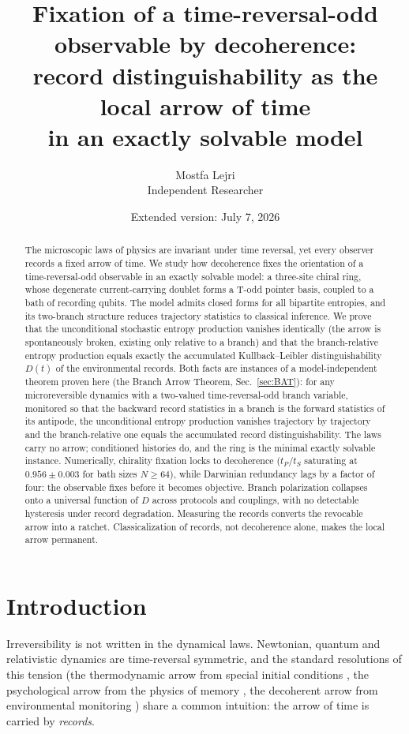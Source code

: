 \documentclass[11pt]{article}
\title{\bfseries Fixation of a time-reversal-odd observable by decoherence:\\
record distinguishability as the local arrow of time\\
in an exactly solvable model}
\author{Mostfa Lejri\\[2pt]
\small Independent Researcher}
\date{\small Extended version: July 7, 2026}
\begin{document}
\maketitle

\begin{abstract}
\noindent
The microscopic laws of physics are invariant under time reversal, yet every observer records a fixed arrow of time. We study how decoherence fixes the orientation of a time-reversal-odd observable in an exactly solvable model: a three-site chiral ring, whose degenerate current-carrying doublet forms a T-odd pointer basis, coupled to a bath of recording qubits. The model admits closed forms for all bipartite entropies, and its two-branch structure reduces trajectory statistics to classical inference. We prove that the unconditional stochastic entropy production vanishes identically (the arrow is spontaneously broken, existing only relative to a branch) and that the branch-relative entropy production equals exactly the accumulated Kullback--Leibler distinguishability $D(t)$ of the environmental records. Both facts are instances of a model-independent theorem proven here (the Branch Arrow Theorem, Sec.~\ref{sec:BAT}): for any microreversible dynamics with a two-valued time-reversal-odd branch variable, monitored so that the backward record statistics in a branch is the forward statistics of its antipode, the unconditional entropy production vanishes trajectory by trajectory and the branch-relative one equals the accumulated record distinguishability. The laws carry no arrow; conditioned histories do, and the ring is the minimal exactly solvable instance. Numerically, chirality fixation locks to decoherence ($t_P/t_S$ saturating at $0.956\pm0.003$ for bath sizes $N\ge64$), while Darwinian redundancy lags by a factor of four: the observable fixes before it becomes objective. Branch polarization collapses onto a universal function of $D$ across protocols and couplings, with no detectable hysteresis under record degradation. Measuring the records converts the revocable arrow into a ratchet. Classicalization of records, not decoherence alone, makes the local arrow permanent.
\end{abstract}

\tableofcontents

\section{Introduction}

Irreversibility is not written in the dynamical laws. Newtonian, quantum and relativistic dynamics are time-reversal symmetric, and the standard resolutions of this tension (the thermodynamic arrow from special initial conditions \cite{Albert2000}, the psychological arrow from the physics of memory \cite{Mlodinow2014}, the decoherent arrow from environmental monitoring \cite{Zeh2007,Zurek2003,Guff2025}) share a common intuition: the arrow of time is carried by \emph{records}.
\end{document}
